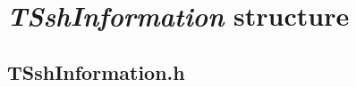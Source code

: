 
\newpage


\section{\textit{TSshInformation} structure}

\subsection{TSshInformation.h}


\newpage
